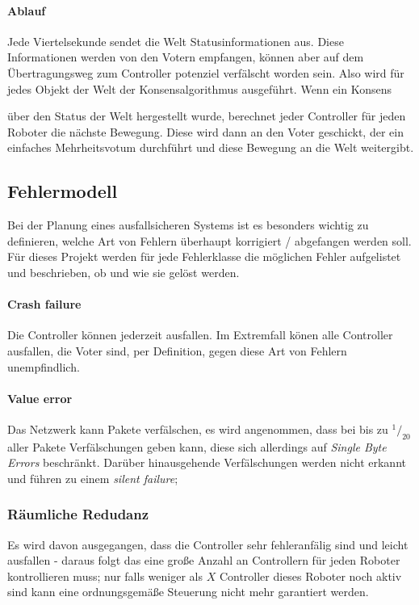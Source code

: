 \paragraph{Ablauf} Jede Viertelsekunde sendet die Welt Statusinformationen aus. Diese Informationen werden von den Votern empfangen, k{\"{o}}nnen
aber auf dem {\"{U}}bertragungsweg zum Controller potenziel verf{\"{a}}lscht worden sein. Also wird f{\"{u}}r jedes Objekt der Welt der Konsensalgorithmus ausgef{\"{u}}hrt. Wenn ein Konsens {\"{u}ber den Status der Welt hergestellt wurde, berechnet 
jeder Controller f{\"{u}}r jeden Roboter die n{\"{a}}chste Bewegung. Diese wird dann an den Voter geschickt, der ein einfaches Mehrheitsvotum durchf{\"{u}}hrt und diese Bewegung an die Welt weitergibt.

\subsection{Fehlermodell} \label{error-model}
Bei der Planung eines ausfallsicheren Systems ist es besonders wichtig zu definieren, welche Art von Fehlern
{\"{u}}berhaupt korrigiert / abgefangen werden soll. F{\"{u}}r dieses Projekt werden f{\"{u}}r jede Fehlerklasse
die m{\"{o}}glichen Fehler aufgelistet und beschrieben, ob und wie sie gel{\"{o}}st werden.

\paragraph{Crash failure} Die Controller k{\"{o}}nnen jederzeit ausfallen. Im Extremfall k{\"{o}}nen alle Controller ausfallen, die Voter sind, per Definition, gegen diese Art von Fehlern unempfindlich.

\paragraph{Value error} Das Netzwerk kann Pakete verf{\"{a}}lschen, es wird angenommen, dass bei bis zu $^1/_{20}$ aller Pakete Verf{\"{a}}lschungen geben kann, diese sich allerdings auf \textit{Single Byte Errors} beschr{\"{a}}nkt.
Dar{\"{u}}ber hinausgehende Verf{\"{a}}lschungen werden nicht erkannt und f{\"{u}}hren zu einem \textit{silent failure}; 

\subsubsection{R{\"{a}}umliche Redudanz}
Es wird davon ausgegangen, dass die Controller sehr fehleranf{\"{a}}lig sind und leicht ausfallen - daraus folgt das eine gro{\ss}e
Anzahl an Controllern f{\"{u}}r jeden Roboter kontrollieren muss; nur falls weniger als $X$ Controller dieses Roboter noch aktiv
sind kann eine ordnungsgem{\"{a}}{\ss}e Steuerung nicht mehr garantiert werden.

}
